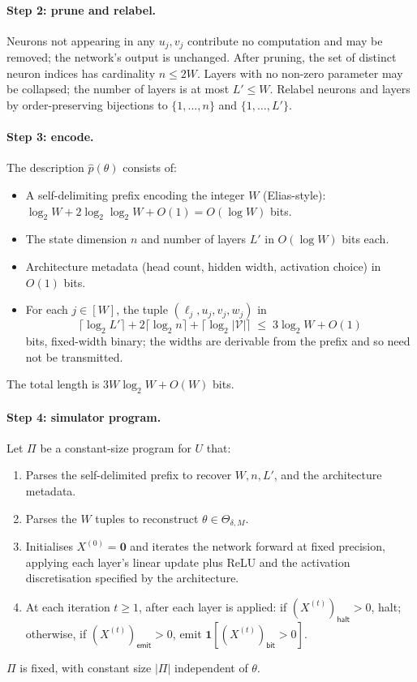 \documentclass{article}
\theoremstyle{definition}
\newcommand{\Param}{\Theta}
\newcommand{\halt}{\mathsf{halt}}
\newcommand{\emit}{\mathsf{emit}}
\newcommand{\bit}{\mathsf{bit}}
\begin{document}
\paragraph{Step 2: prune and relabel.} Neurons not appearing in any $u_j, v_j$ contribute no computation and may be
removed; the network's output is unchanged. After pruning, the set of distinct
neuron indices has cardinality $n \le 2W$. Layers with no non-zero parameter
may be collapsed; the number of layers is at most $L' \le W$. Relabel neurons
and layers by order-preserving bijections to $\{1, \ldots, n\}$ and $\{1,
  \ldots, L'\}$.

\paragraph{Step 3: encode.} The description $\hat p(\theta)$ consists of:
\begin{itemize}
  \item A self-delimiting prefix encoding the integer $W$ (Elias-style): $\log_2 W + 2
          \log_2 \log_2 W + O(1) = O(\log W)$ bits.
  \item The state dimension $n$ and number of layers $L'$ in $O(\log W)$ bits each.
  \item Architecture metadata (head count, hidden width, activation choice) in $O(1)$
        bits.
  \item For each $j \in [W]$, the tuple $(\ell_j, u_j, v_j, w_j)$ in
        \[
          \lceil \log_2 L' \rceil + 2 \lceil \log_2 n \rceil + \lceil \log_2 |\mathcal{V}| \rceil \;\le\; 3 \log_2 W + O(1)
        \]
        bits, fixed-width binary; the widths are derivable from the prefix and so need
        not be transmitted.
\end{itemize}
The total length is $3 W \log_2 W + O(W)$ bits.

\paragraph{Step 4: simulator program.} Let $\Pi$ be a constant-size program for $U$ that:
\begin{enumerate}
  \item Parses the self-delimited prefix to recover $W, n, L'$, and the architecture
        metadata.
  \item Parses the $W$ tuples to reconstruct $\theta \in \Param_{\delta, M}$.
  \item Initialises $X^{(0)} = \mathbf{0}$ and iterates the network forward at fixed
        precision, applying each layer's linear update plus ReLU and the activation
        discretisation specified by the architecture.
  \item At each iteration $t \ge 1$, after each layer is applied: if $(X^{(t)})_{\halt}
          > 0$, halt; otherwise, if $(X^{(t)})_{\emit} > 0$, emit
        $\mathbf{1}[(X^{(t)})_{\bit} > 0]$.
\end{enumerate}
$\Pi$ is fixed, with constant size $|\Pi|$ independent of $\theta$.
\end{document}
